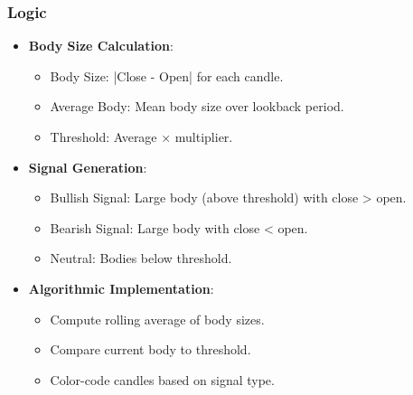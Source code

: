 \documentclass[12pt]{article}
\begin{document}
\subsubsection{Logic}
\begin{itemize}
\item \textbf{Body Size Calculation}:
  \begin{itemize}
  \item Body Size: |Close - Open| for each candle.
  \item Average Body: Mean body size over lookback period.
  \item Threshold: Average × multiplier.
  \end{itemize}
\item \textbf{Signal Generation}:
  \begin{itemize}
  \item Bullish Signal: Large body (above threshold) with close > open.
  \item Bearish Signal: Large body with close < open.
  \item Neutral: Bodies below threshold.
  \end{itemize}
\item \textbf{Algorithmic Implementation}:
  \begin{itemize}
  \item Compute rolling average of body sizes.
  \item Compare current body to threshold.
  \item Color-code candles based on signal type.
  \end{itemize}
\end{itemize}
\end{document}
